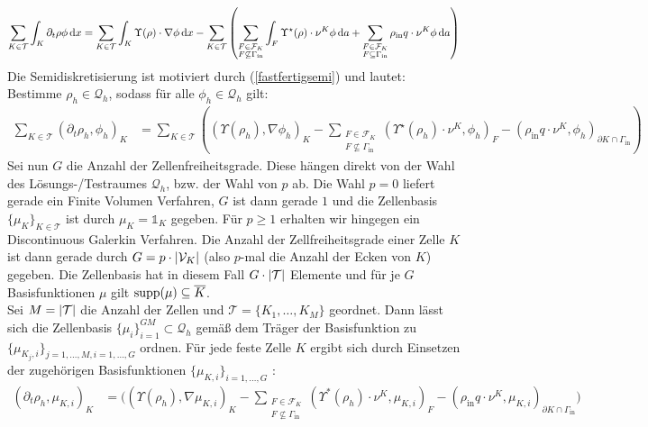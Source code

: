 \begin{align}
	\label{fastfertigsemi}
	\sum_{K \in \mathcal{T}} \int_K \partial_t \rho  \phi \, \mathrm{d} x = \sum_{K \in \mathcal{T}} \int_K \Upsilon(\rho ) \cdot \nabla \phi \, \mathrm{d} x - 	\sum_{K\in \mathcal{T}} \left( \sum_{\substack{F \in \mathcal{F}_K \\ F \not\subseteq \Gamma_{\text{in}}}} \int_F \Upsilon^{\star}(\rho) \cdot \nu^K \phi \, \mathrm{d} a + \sum_{\substack{F \in \mathcal{F}_K \\ F \subseteq \Gamma_{\text{in}}}} \rho_{\text{in}} q \cdot \nu^K \phi \, \mathrm{d} a \right)
\end{align}
 Die Semidiskretisierung ist motiviert durch (\ref{fastfertigsemi}) und lautet: Bestimme  $\rho_h \in \mathcal{Q}_h$, sodass für alle $ \phi_h \in \mathcal{Q}_h $ gilt:
\begin{align}
	\label{Semidiskretisierung}
	\sum_{K \in \mathcal{T}} (\partial_t \rho_h, \phi_h)_{K} &= \sum_{K \in \mathcal{T}} \left( (\Upsilon(\rho_h), \nabla \phi_h)_{K} - \sum_{\substack{F \in \mathcal{F}_K \\ F \not \subseteq \Gamma_{\text{in}}}}(\Upsilon^{\star}(\rho_h)\cdot \nu^K,\phi_h)_{F} - (\rho_{\text{in}}q \cdot \nu^K,\phi_h)_{\partial K \cap \Gamma_{\text{in}}} \right)
\end{align}
 Sei nun $ G $ die Anzahl der Zellenfreiheitsgrade. Diese hängen direkt von der Wahl des Lösungs-/Testraumes $ \mathcal{Q}_h $, bzw. der Wahl von $ p $ ab. Die Wahl $ p=0 $ liefert gerade ein Finite Volumen Verfahren, $ G $ ist dann gerade $ 1 $ und die Zellenbasis $ \{\mu_K \}_{K \in \mathcal{T}}$ ist durch $ \mu_K =  \mathds{1}_{K} $ gegeben.
 Für $ p \geq 1 $ erhalten wir hingegen ein Discontinuous Galerkin Verfahren. Die Anzahl der Zellfreiheitsgrade einer Zelle $ K $ ist dann gerade durch $ G = p \cdot | \mathcal{V}_K | $ (also $ p $-mal die Anzahl der Ecken von $ K $) gegeben.
 Die Zellenbasis hat in diesem Fall $ G \cdot | \mathcal{T} | $ Elemente und für je $ G $ Basisfunktionen $ \mu $ gilt $ \operatorname{supp}(\mu) \subseteq \overline{K} $. \\
 Sei $ M = | \mathcal{T} | $ die Anzahl der Zellen und $ \mathcal{T} = \{K_1,\dots,K_M \} $ geordnet. Dann lässt sich die Zellenbasis $ \{ \mu_i \}_{i=1}^{GM} \subset \mathcal{Q}_h $ gemäß dem Träger der Basisfunktion zu $ \{ \mu_{K_j,i} \}_{j = 1,\dots,M , i = 1,\dots,G } $ ordnen.
 Für jede feste Zelle $ K $ ergibt sich durch Einsetzen der zugehörigen Basisfunktionen $ \{ \mu_{K,i} \}_{i = 1,\dots,G }  $ : \\
\begin{align*} 
\left(\partial_t \rho_h, \mu_{K,i}  \right)_{K}  &= \bigg( \left(\Upsilon(\rho_h), \nabla\mu_{K,i}\right)_{K} - \sum_{\substack{F \in \mathcal{F}_{K} \\ F \not\subseteq \Gamma_{\text{in}}}} \left(\Upsilon^*(\rho_h) \cdot \nu^{K}, \mu_{K,i} \right)_{F} - \left(\rho_{\text{in}} q \cdot \nu^{K}, \mu_{K,i} \right)_{\partial K \cap \Gamma_{\text{in}}} \bigg) \\
\end{align*}
